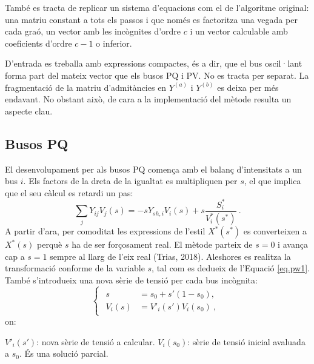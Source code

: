 També es tracta de replicar un sistema d'equacions com el de l'algoritme original: una matriu constant a tots els passos i que només es factoritza una vegada per cada graó, un vector amb les incògnites d'ordre $c$ i un vector calculable amb coeficients d'ordre $c-1$ o inferior.

D'entrada es treballa amb expressions compactes, és a dir, que el bus oscil·lant forma part del mateix vector que els busos PQ i PV. No es tracta per separat. La fragmentació de la matriu d'admitàncies en $Y^{(a)}$ i $Y^{(b)}$ es deixa per més endavant. No obstant això, de cara a la implementació del mètode resulta un aspecte clau.

\subsection{Busos PQ}
El desenvolupament per als busos PQ comença amb el balanç d'intensitats a un bus $i$. Els factors de la dreta de la igualtat es multipliquen per $s$, el que implica que el seu càlcul es retardi un pas:
\begin{equation}
    \sum_{j}Y_{ij}V_j(s)=-sY_{sh,i}V_i(s)+s\frac{S^*_i}{V^*_i(s^*)}\ .
        \label{eq:P1}
\end{equation}
A partir d'ara, per comoditat les expressions de l'estil $X^*(s^*)$ es converteixen a $X^*(s)$ perquè $s$ ha de ser forçosament real. El mètode parteix de $s=0$ i avança cap a $s=1$ sempre al llarg de l'eix real (Trias, 2018). Aleshores es realitza la transformació conforme de la variable $s$, tal com es dedueix de l'Equació \ref{eq.pw1}. També s'introdueix una nova sèrie de tensió per cada bus incògnita:
\begin{equation}
    \begin{cases}
    \begin{split}
        s&=s_0+s'(1-s_0),\\
        V_i(s)&=V'_i(s')V_i(s_0)\ ,
    \end{split}
\end{cases}
        \label{eq:P2}
\end{equation}
on:

$V'_i(s')$: nova sèrie de tensió a calcular.
\vs
$V_i(s_0)$: sèrie de tensió inicial avaluada a $s_0$. És una solució parcial.

